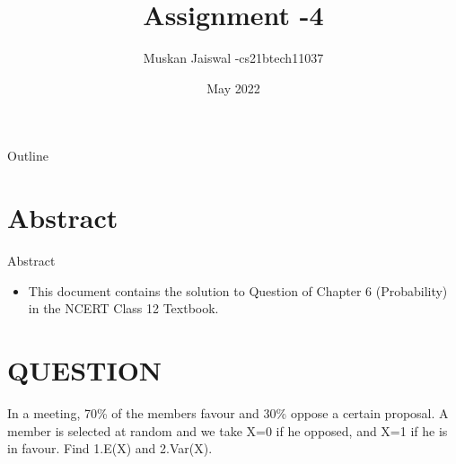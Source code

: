 \documentclass{beamer}
\title{Assignment -4}
\author{Muskan Jaiswal -cs21btech11037}
\date{May 2022}
\begin{document}
\begin{frame}
		\titlepage
	\end{frame}

\begin{frame}{Outline}
  \tableofcontents
\end{frame}

\section{Abstract}
	\begin{frame}{Abstract}
		\begin{itemize}
			\item 	This document contains the solution to Question of Chapter 6 (Probability) in the NCERT Class 12 Textbook.
		\end{itemize}
	\end{frame}



\section{QUESTION }
\begin{frame}{}
\begin{block}{}
    In a meeting, 70\% of the members favour and 30\% oppose a certain proposal. A member is selected at random and we take X=0 if he opposed, and X=1 if he is in favour. Find 1.E(X) and 2.Var(X).
\end{block}
\end{frame}
\end{document}
